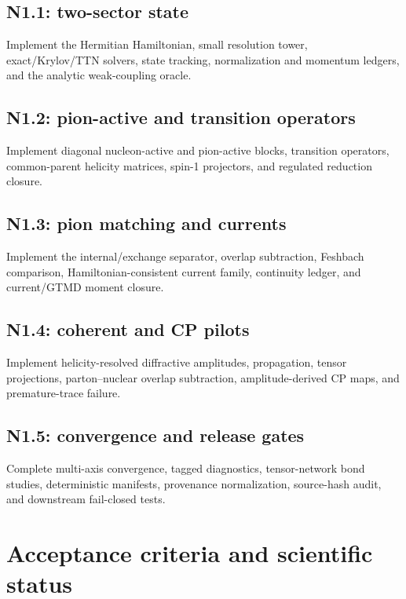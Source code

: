 \documentclass[11pt]{article}
\begin{document}
\subsection{N1.1: two-sector state}

Implement the Hermitian Hamiltonian, small resolution tower, exact/Krylov/TTN
solvers, state tracking, normalization and momentum ledgers, and the analytic
weak-coupling oracle.

\subsection{N1.2: pion-active and transition operators}

Implement diagonal nucleon-active and pion-active blocks, transition
operators, common-parent helicity matrices, spin-1 projectors, and regulated
reduction closure.

\subsection{N1.3: pion matching and currents}

Implement the internal/exchange separator, overlap subtraction, Feshbach
comparison, Hamiltonian-consistent current family, continuity ledger, and
current/GTMD moment closure.

\subsection{N1.4: coherent and CP pilots}

Implement helicity-resolved diffractive amplitudes, propagation, tensor
projections, parton--nuclear overlap subtraction, amplitude-derived CP maps,
and premature-trace failure.

\subsection{N1.5: convergence and release gates}

Complete multi-axis convergence, tagged diagnostics, tensor-network bond
studies, deterministic manifests, provenance normalization, source-hash audit,
and downstream fail-closed tests.

\section{Acceptance criteria and scientific status}
\label{sec:acceptance}
\end{document}
